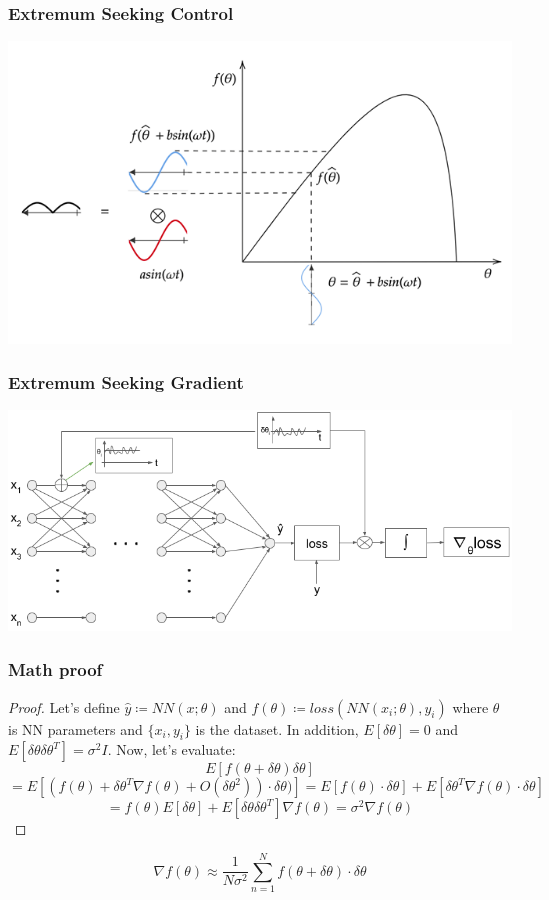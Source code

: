 \documentclass[
	11pt, %
]{beamer}
\begin{document}

\begin{frame}
  \frametitle{Extremum Seeking Control}
  \includegraphics[width=0.9\columnwidth]{../report/images/esc_increasing_objective.png}
\end{frame}




\begin{frame}
  \frametitle{Extremum Seeking Gradient}
  \includegraphics[width=\columnwidth]{../report/images/ESG-scheme.png}
\end{frame}




\begin{frame}
  \frametitle{Math proof}
  \begin{proof}
    Let's define $\hat{y} \coloneqq NN(x;\theta)$ and $f(\theta) \coloneqq loss(NN(x_{i};\theta),y_{i})$
    where $\theta$ is NN parameters and $\{x_{i},y_{i}\}$ is the dataset. In addition, $E[\delta\theta] = 0$ and $E[\delta\theta \delta\theta^{T}]=\sigma^{2}I$. \newline
    Now, let's evaluate:
    $$E[f(\theta+\delta\theta)\delta\theta]$$
    $$=E[(f(\theta)+\delta\theta^{T} \nabla f(\theta)+O(\delta\theta^{2}))\cdot \delta\theta)] = E[f(\theta)\cdot \delta\theta]+E[\delta\theta^{T} \nabla f(\theta)\cdot \delta\theta]$$
    $$=f(\theta)E[\delta\theta]+E[\delta\theta \delta\theta^{T}] \nabla f(\theta) = \sigma^{2} \nabla f(\theta)$$ 
 \end{proof}


\begin{theorem}[ESG]
$$\nabla f(\theta) \approx \frac{1}{N\sigma^{2}}\sum^{N}_{n=1} f(\theta+\delta\theta)\cdot \delta\theta$$
\end{theorem}



\end{frame}
\end{document}
